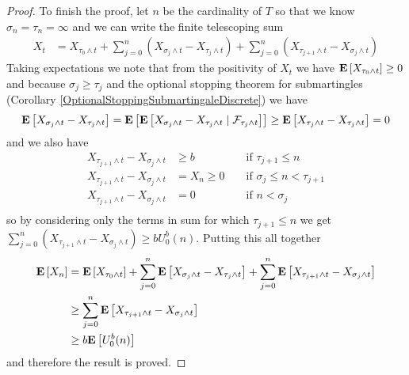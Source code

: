 \begin{proof}
To finish the proof, let $n$ be the cardinality of $T$ so that we know
$\sigma_n = \tau_n = \infty$ and we can write the finite telescoping sum
\begin{align*}
X_t &= X_{\tau_0 \wedge t} + \sum_{j=0}^n \left ( X_{\sigma_j \wedge t} - X_{\tau_j
    \wedge t} \right) + \sum_{j=0}^n \left ( X_{\tau_{j+1} \wedge t} - X_{\sigma_j
    \wedge t} \right)
\end{align*}
Taking expectations we note that from the positivity of $X_t$ we have
$\expectation{X_{\tau_0 \wedge t}}\geq 0$ and because $\sigma_j \geq
\tau_j$ and the optional stopping theorem for submartingles
(Corollary \ref{OptionalStoppingSubmartingaleDiscrete}) we have
\begin{align*}
\expectation{X_{\sigma_j \wedge t} - X_{\tau_j    \wedge t} } &=
\expectation{\cexpectationlong{\mathcal{F}_{\tau_j \wedge t}}{X_{\sigma_j \wedge t}
    - X_{\tau_j    \wedge t}}} 
\geq \expectation{X_{\tau_j \wedge t}
    - X_{\tau_j    \wedge t}} = 0\\
\end{align*}
and we also have
\begin{align*}
X_{\tau_{j+1} \wedge t} - X_{\sigma_j \wedge t} &\geq b && \text{ if  $\tau_{j+1} \leq n$} \\
X_{\tau_{j+1} \wedge t} - X_{\sigma_j \wedge t} &=X_n \geq 0 && \text{ if  $\sigma_j \leq n < \tau_{j+1}$} \\
X_{\tau_{j+1} \wedge t} - X_{\sigma_j \wedge t} &= 0 && \text{ if $n < \sigma_j$} \\
\end{align*}
so by considering only the terms in sum for which $\tau_{j+1} \leq n$
we get $\sum_{j=0}^n \left( X_{\tau_{j+1} \wedge t} - X_{\sigma_j
    \wedge t} \right ) \geq b U_0^b(n)$.   
Putting this all together
\begin{align*}
\expectation{X_n} &= \expectation{X_{\tau_0 \wedge t}} + 
\sum_{j=0}^n \expectation{ X_{\sigma_j \wedge t} - X_{\tau_j \wedge t}} + 
\sum_{j=0}^n \expectation{X_{\tau_{j+1} \wedge t} - X_{\sigma_j \wedge t}} \\
&\geq \sum_{j=0}^n \expectation{X_{\tau_{j+1} \wedge t} - X_{\sigma_j \wedge t}} \\
&\geq b \expectation{U_0^b(n)}
\end{align*}
and therefore the result is proved.
\end{proof}

